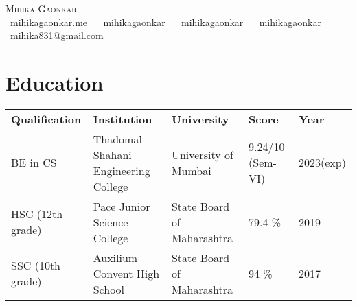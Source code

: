 \documentclass[10pt]{article}
\begin{document}




\begin{center}
    {\HUGE \scshape Mihika Gaonkar} \\ \vspace{1pt}
    \large
    \faGlobe \href{https://mihikagaonkar.me}{\raisebox{-0.1\height}\ mihikagaonkar.me} ~
    \faGithub \href{https://github.com/mihikagaonkar}{\raisebox{-0.2\height}\ mihikagaonkar} ~
    \faLinkedin \href{https://linkedin.com/in/mihikagaonkar}{\raisebox{-0.2\height}\ mihikagaonkar} ~
    \faMedium \href{https://medium.com/@mihikagaonkar}{\raisebox{-0.2\height}\ mihikagaonkar} ~
    \faEnvelope \href{mailto:mihika831@gmail.com}{\raisebox{-0.2\height}\  mihika831@gmail.com}
    \vspace{-13pt}
\end{center}








\section{Education}
    \vspace{2pt}
    \begin{itemize}[leftmargin=-0in,label={}]
        {\item{
            \begin{tabular}{ l@{\hskip 0.2in} l@{\hskip 0.2in} l@{\hskip 0.2in} l@{\hskip 0.2in} l }
                 \textbf{Qualification} & \textbf{Institution} & \textbf{University} & \textbf{Score} & \textbf{Year} \\ 
                 BE in CS & Thadomal Shahani Engineering College & University of Mumbai & 9.24/10 (Sem-VI) & 2023(exp)\\
                 HSC (12th grade) & Pace Junior Science College & State Board of Maharashtra & 79.4 \% & 2019\\
                 SSC (10th grade) & Auxilium Convent High School & State Board of Maharashtra & 94 \% & 2017
            \end{tabular}
        }}
    \end{itemize}
\vspace{-20pt}
\end{document}
